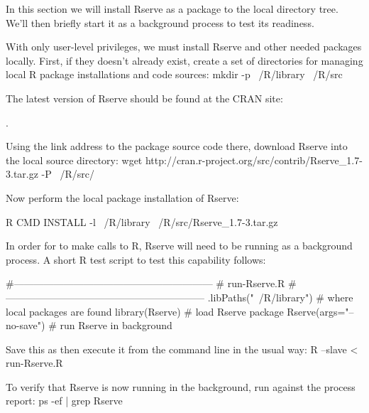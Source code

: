 
\startsubsubject[title={Installing and executing Rserve}]

In this section we will install Rserve as a package to the local directory tree.
We'll then briefly start it as a background process to test its readiness.

With only user-level privileges, we must install Rserve and other needed packages
locally.
First, if they doesn't already exist, create a set of directories
for managing local R package installations and code sources:
\startSTDIN
  mkdir -p ~/R/library ~/R/src
\stopSTDIN

The latest version of Rserve should be found at the CRAN site:

\from[CRAN].

Using the link address to the package source code there, 
download Rserve into the local source directory:
\startSTDIN
  wget http://cran.r-project.org/src/contrib/Rserve_1.7-3.tar.gz -P ~/R/src/
\stopSTDIN

Now perform the local package installation of Rserve:

\startSTDIN
  R CMD INSTALL -l ~/R/library ~/R/src/Rserve_1.7-3.tar.gz
\stopSTDIN



In order for \PLINK to make calls to R, Rserve will need to be running 
as a background process.
A short R test script to test this capability follows:

\startSTDOUT
#------------------------------------------------------------
# run-Rserve.R
#------------------------------------------------------------
.libPaths("~/R/library")   # where local packages are found
library(Rserve)            # load Rserve package
Rserve(args="--no-save")   # run Rserve in background
\stopSTDOUT

Save this as  then execute it from the command line in the usual way:
\startSTDIN
  R --slave < run-Rserve.R 
\stopSTDIN

To verify that Rserve is now running in the background, run  against
the process report:
\startSTDIN
  ps -ef | grep Rserve
\stopSTDIN

